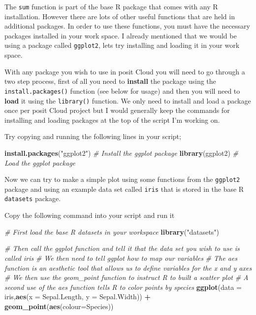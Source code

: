 \documentclass[
]{book}
\newenvironment{Shaded}{\begin{snugshade}}{\end{snugshade}}
\newcommand{\AttributeTok}[1]{\textcolor[rgb]{0.13,0.29,0.53}{#1}}
\newcommand{\CommentTok}[1]{\textcolor[rgb]{0.56,0.35,0.01}{\textit{#1}}}
\newcommand{\FunctionTok}[1]{\textcolor[rgb]{0.13,0.29,0.53}{\textbf{#1}}}
\newcommand{\NormalTok}[1]{#1}
\newcommand{\SpecialCharTok}[1]{\textcolor[rgb]{0.81,0.36,0.00}{\textbf{#1}}}
\newcommand{\StringTok}[1]{\textcolor[rgb]{0.31,0.60,0.02}{#1}}
\begin{document}
The \texttt{sum} function is part of the base R package that comes with any R installation. However there are lots of other useful functions that are held in additional packages. In order to use these functions, you must have the necessary packages installed in your work space. I already mentioned that we would be using a package called \texttt{ggplot2}, lets try installing and loading it in your work space.

With any package you wish to use in posit Cloud you will need to go through a two step process, first of all you need to \textbf{install} the package using the \texttt{install.packages()} function (see below for usage) and then you will need to \textbf{load} it using the \texttt{library()} function. We only need to install and load a package once per posit Cloud project but I would generally keep the commands for installing and loading packages at the top of the script I'm working on.

Try copying and running the following lines in your script;

\begin{Shaded}
\begin{Highlighting}[]
\FunctionTok{install.packages}\NormalTok{(}\StringTok{"ggplot2"}\NormalTok{) }\CommentTok{\# Install the ggplot package}
\FunctionTok{library}\NormalTok{(ggplot2) }\CommentTok{\# Load the ggplot package}
\end{Highlighting}
\end{Shaded}

Now we can try to make a simple plot using some functions from the \texttt{ggplot2} package and using an example data set called \texttt{iris} that is stored in the base R \texttt{datasets} package.

Copy the following command into your script and run it

\begin{Shaded}
\begin{Highlighting}[]
\CommentTok{\# First load the base R datasets in your workspace}
\FunctionTok{library}\NormalTok{(}\StringTok{"datasets"}\NormalTok{)}

\CommentTok{\# Then call the ggplot function and tell it that the data set you wish to use is called iris}
\CommentTok{\# We then need to tell ggplot how to map our variables}
\CommentTok{\# The aes function is an aesthetic tool that allows us to define variables for the x and y axes}
\CommentTok{\# We then use the geom\_point function to instruct R to built a scatter plot}
\CommentTok{\# A second use of the aes function tells R to color points by species}
\FunctionTok{ggplot}\NormalTok{(}\AttributeTok{data =}\NormalTok{ iris,}\FunctionTok{aes}\NormalTok{(}\AttributeTok{x =}\NormalTok{ Sepal.Length, }\AttributeTok{y =}\NormalTok{ Sepal.Width)) }\SpecialCharTok{+} 
  \FunctionTok{geom\_point}\NormalTok{(}\FunctionTok{aes}\NormalTok{(}\AttributeTok{colour=}\NormalTok{Species)) }
\end{Highlighting}
\end{Shaded}
\end{document}
